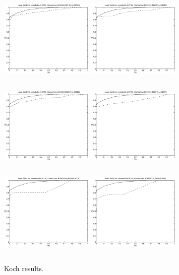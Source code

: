 \documentclass[12pt]{article}
\begin{document}
\begin{figure}[p]
	\includegraphics[height=4.5cm,width=4.5cm]{kochplot4.eps}
	\includegraphics[height=4.5cm,width=4.5cm]{kochplot6.eps}
	\includegraphics[height=4.5cm,width=4.5cm]{kochplot8.eps}
	\includegraphics[height=4.5cm,width=4.5cm]{kochplot10.eps}
	\includegraphics[height=4.5cm,width=4.5cm]{kochplot12.eps}
	\includegraphics[height=4.5cm,width=4.5cm]{kochplot14.eps}
	\caption{Koch results.}
\end{figure}
\end{document}
